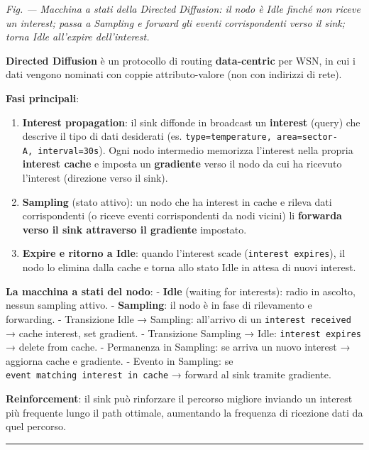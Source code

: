 \documentclass[
  italian,
  openany]{book}
\begin{document}
\emph{Fig. --- Macchina a stati della Directed Diffusion: il nodo è Idle
finché non riceve un interest; passa a Sampling e forward gli eventi
corrispondenti verso il sink; torna Idle all'expire dell'interest.}

\textbf{Directed Diffusion} è un protocollo di routing
\textbf{data-centric} per WSN, in cui i dati vengono nominati con coppie
attributo-valore (non con indirizzi di rete).

\textbf{Fasi principali}:

\begin{enumerate}
\def\labelenumi{\arabic{enumi}.}
\item
  \textbf{Interest propagation}: il sink diffonde in broadcast un
  \textbf{interest} (query) che descrive il tipo di dati desiderati (es.
  \texttt{type=temperature,\ area=sector-A,\ interval=30s}). Ogni nodo
  intermedio memorizza l'interest nella propria \textbf{interest cache}
  e imposta un \textbf{gradiente} verso il nodo da cui ha ricevuto
  l'interest (direzione verso il sink).
\item
  \textbf{Sampling} (stato attivo): un nodo che ha interest in cache e
  rileva dati corrispondenti (o riceve eventi corrispondenti da nodi
  vicini) li \textbf{forwarda verso il sink attraverso il gradiente}
  impostato.
\item
  \textbf{Expire e ritorno a Idle}: quando l'interest scade
  (\texttt{interest\ expires}), il nodo lo elimina dalla cache e torna
  allo stato Idle in attesa di nuovi interest.
\end{enumerate}

\textbf{La macchina a stati del nodo}: - \textbf{Idle} (waiting for
interests): radio in ascolto, nessun sampling attivo. -
\textbf{Sampling}: il nodo è in fase di rilevamento e forwarding. -
Transizione Idle → Sampling: all'arrivo di un
\texttt{interest\ received} → cache interest, set gradient. -
Transizione Sampling → Idle: \texttt{interest\ expires} → delete from
cache. - Permanenza in Sampling: se arriva un nuovo interest → aggiorna
cache e gradiente. - Evento in Sampling: se
\texttt{event\ matching\ interest\ in\ cache} → forward al sink tramite
gradiente.

\textbf{Reinforcement}: il sink può rinforzare il percorso migliore
inviando un interest più frequente lungo il path ottimale, aumentando la
frequenza di ricezione dati da quel percorso.

\begin{center}\rule{0.5\linewidth}{0.5pt}\end{center}
\end{document}
